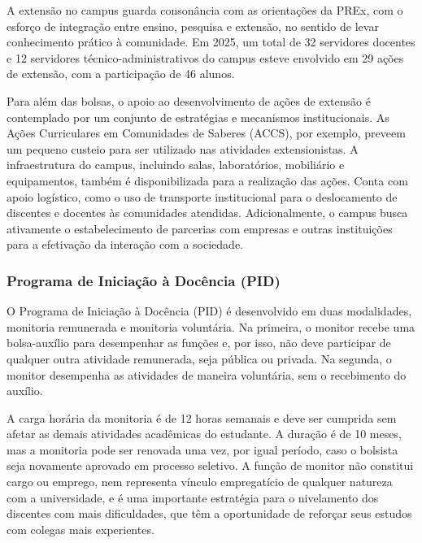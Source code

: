 A extensão no campus guarda consonância com as orientações da PREx, com o esforço de integração entre ensino, pesquisa e extensão, no sentido de levar conhecimento prático à comunidade. Em 2025, um total de 32 servidores docentes e 12 servidores técnico-administrativos do campus esteve envolvido em 29 ações de extensão, com a participação de 46 alunos.

Para além das bolsas, o apoio ao desenvolvimento de ações de extensão é contemplado por um conjunto de estratégias e mecanismos institucionais. As Ações Curriculares em Comunidades de Saberes (ACCS), por exemplo, preveem um pequeno custeio para ser utilizado nas atividades extensionistas. A infraestrutura do campus, incluindo salas, laboratórios, mobiliário e equipamentos, também é disponibilizada para a realização das ações. Conta com apoio logístico, como o uso de transporte institucional para o deslocamento de discentes e docentes às comunidades atendidas. Adicionalmente, o campus busca ativamente o estabelecimento de parcerias com empresas e outras instituições para a efetivação da interação com a sociedade.



\subsubsection{Programa de Iniciação à Docência (PID)}

O Programa de Iniciação à Docência (PID) é desenvolvido em duas modalidades, monitoria remunerada e monitoria voluntária. Na primeira, o monitor recebe uma bolsa-auxílio para desempenhar as funções e, por isso, não deve participar de qualquer outra atividade remunerada, seja pública ou privada. Na segunda, o monitor desempenha as atividades de maneira voluntária, sem o recebimento do auxílio.

A carga horária da monitoria é de 12 horas semanais e deve ser cumprida sem afetar as demais atividades acadêmicas do estudante. A duração é de 10 meses, mas a monitoria pode ser renovada uma vez, por igual período, caso o bolsista seja novamente aprovado em processo seletivo. A função de monitor não constitui cargo ou emprego, nem representa vínculo empregatício de qualquer natureza com a universidade, e é uma importante estratégia para o nivelamento dos discentes com mais dificuldades, que têm a oportunidade de reforçar seus estudos com colegas mais experientes.


